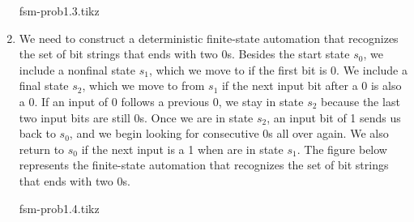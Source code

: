 \documentclass[12pt,class=article,crop=false]{standalone}
\begin{document}
\begin{soln}
\begin{enumerate}[label=(\alph*)]
        \begin{minipage}[c]{.9\textwidth}
            \centering
            {fsm-prob1.3.tikz}
        \end{minipage}
        \item We need to construct a deterministic finite-state automation that recognizes the set of bit strings that ends with two 0s. Besides the start state $ s_0 $, we include a nonfinal state $ s_1 $, which we move to if the first bit is 0. We include a final state $ s_2 $, which we move to from $ s_1 $ if the next input bit after a 0 is also a 0. If an input of 0 follows a previous 0, we stay in state $ s_2 $ because the last two input bits are still 0s. Once we are in state $ s_2 $, an input bit of 1 sends us back to $ s_0 $, and we begin looking for consecutive 0s all over again. We also return to $ s_0 $ if the next input is a 1 when are in state $ s_1 $. The figure below represents the finite-state automation that recognizes the set of bit strings that ends with two 0s.\\
        \begin{minipage}[c]{.9\textwidth}
            \centering
            {fsm-prob1.4.tikz}
        \end{minipage}
    \end{enumerate}
\end{soln}
\end{document}
